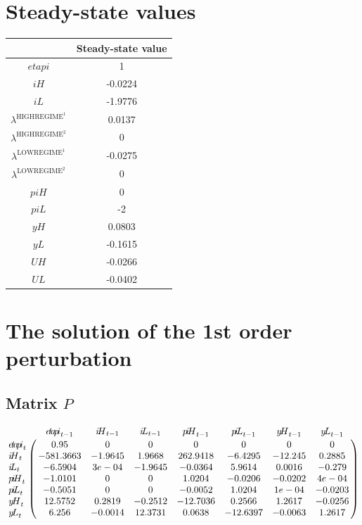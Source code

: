 

\section{Steady-state values}


\begin{tabular}{c|c|}
  & Steady-state value\\
\hline
${e\!t\!a\!p\!i}$ & 1 \\
${i\!H}$ & -0.0224 \\
${i\!L}$ & -1.9776 \\
$\lambda^{\mathrm{HIGHREGIME}^{\mathrm{1}}}$ & 0.0137 \\
$\lambda^{\mathrm{HIGHREGIME}^{\mathrm{2}}}$ & 0 \\
$\lambda^{\mathrm{LOWREGIME}^{\mathrm{1}}}$ & -0.0275 \\
$\lambda^{\mathrm{LOWREGIME}^{\mathrm{2}}}$ & 0 \\
${p\!i\!H}$ & 0 \\
${p\!i\!L}$ & -2 \\
${y\!H}$ & 0.0803 \\
${y\!L}$ & -0.1615 \\
${U\!H}$ & -0.0266 \\
${U\!L}$ & -0.0402 \\
\hline
\end{tabular}


\section{The solution of the 1st order perturbation}

\subsection*{Matrix $P$}

$$\bordermatrix{
~ & {e\!t\!a\!p\!i}_{t-1} & {i\!H}_{t-1} & {i\!L}_{t-1} & {p\!i\!H}_{t-1} & {p\!i\!L}_{t-1} & {y\!H}_{t-1} & {y\!L}_{t-1} \cr
{e\!t\!a\!p\!i}_{t} & 0.95 & 0 & 0 & 0 & 0 & 0 & 0 \cr
{i\!H}_{t} & -581.3663 & -1.9645 & 1.9668 & 262.9418 & -6.4295 & -12.245 & 0.2885 \cr
{i\!L}_{t} & -6.5904 & 3e-04 & -1.9645 & -0.0364 & 5.9614 & 0.0016 & -0.279 \cr
{p\!i\!H}_{t} & -1.0101 & 0 & 0 & 1.0204 & -0.0206 & -0.0202 & 4e-04 \cr
{p\!i\!L}_{t} & -0.5051 & 0 & 0 & -0.0052 & 1.0204 & 1e-04 & -0.0203 \cr
{y\!H}_{t} & 12.5752 & 0.2819 & -0.2512 & -12.7036 & 0.2566 & 1.2617 & -0.0256 \cr
{y\!L}_{t} & 6.256 & -0.0014 & 12.3731 & 0.0638 & -12.6397 & -0.0063 & 1.2617 \cr
}$$

